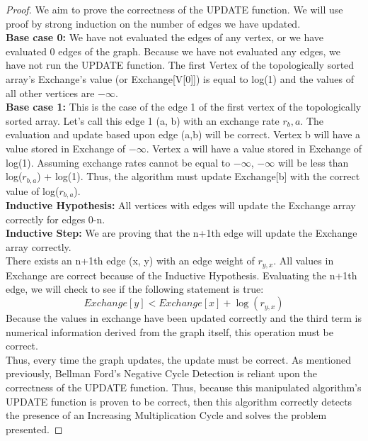 \documentclass[11pt, solution, letterpaper]{format}
\begin{document}
\begin{proof} We aim to prove the correctness of the UPDATE function. We will use proof by strong induction on the number of edges we have updated. \\

\textbf{Base case 0:} We have not evaluated the edges of any vertex, or we have evaluated 0 edges of the graph. Because we have not evaluated any edges, we have not run the UPDATE function. The first Vertex of the topologically sorted array's Exchange's value (or Exchange[V[0]]) is equal to log(1) and the values of all other vertices are $-\infty$.\\

\textbf{Base case 1:} This is the case of the edge 1 of the first vertex of the topologically sorted array. Let's call this edge 1 (a, b) with an exchange rate $r_b,a$. The evaluation and update based upon edge (a,b) will be correct. Vertex b will have a value stored in Exchange of $-\infty$. Vertex a will have a value stored in Exchange of log(1). Assuming exchange rates cannot be equal to $-\infty$, $-\infty$ will be less than log($r_{b,a}$) + log(1). Thus, the algorithm must update Exchange[b] with the correct value of log($r_{b,a}$). \\

\textbf{Inductive Hypothesis:} All vertices with edges will update the Exchange array correctly for edges 0-n.\\

\textbf{Inductive Step:} We are proving that the n+1th edge will update the Exchange array correctly.\\

There exists an n+1th edge (x, y) with an edge weight of $r_{y, x}$. All values in Exchange are correct because of the Inductive Hypothesis.
Evaluating the n+1th edge, we will check to see if the following statement is true: 
$$Exchange[y] < Exchange[x] + \log(r_{y, x})$$
Because the values in exchange have been updated correctly and the third term is numerical information derived from the graph itself, this operation must be correct.\\

Thus, every time the graph updates, the update must be correct. As mentioned previously, Bellman Ford's Negative Cycle Detection is reliant upon the correctness of the UPDATE function. Thus, because this manipulated algorithm's UPDATE function is proven to be correct, then this algorithm correctly detects the presence of an Increasing Multiplication Cycle and solves the problem presented.\end{proof}\\
\end{document}
